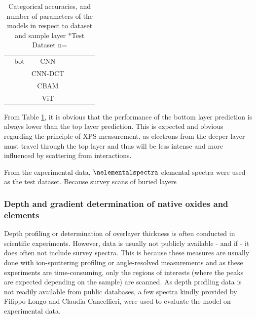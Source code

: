 \begin{table}[H]
{\begin{tabular}{c|c|c|c|c|c|c}
                & bot   & CNN     &                &               &                &             \\
                &       & CNN-DCT &                &               &                &             \\
                &       & CBAM    &                &               &                &            \\
                &       & ViT     &                &               &                &            \\
    \end{tabular}}
    \caption{Categorical accuracies, and number of parameters of the models in respect to dataset and sample layer
    *Test Dataset n=\nelementalspectra}
    \label{tab:acc_qual}
\end{table}

From Table \ref{tab:acc_qual}, it is obvious that the performance of the bottom layer prediction is always lower than the top layer prediction. This is expected and obvious regarding the principle of XPS measurement, as electrons from the deeper layer must travel through the top layer and thus will be less intense and more influenced by scattering from interactions.

From the experimental data, $\nelementalspectra$ elemental spectra were used as the test dataset. Because survey scans of buried layers

\subsubsection{Depth and gradient determination of native oxides and elements}
Depth profiling or determination of overlayer thickness is often conducted in scientific experiments. However, data is usually not publicly available - and if - it does often not include survey spectra. This is because these measures are usually done with ion-sputtering profiling or angle-resolved measurements and as these experiments are time-consuming, only the regions of interests (where the peaks are expected depending on the sample) are scanned.
As depth profiling data is not readily available from public databases, a few spectra kindly provided by Filippo Longo and Claudia Cancellieri, were used to evaluate the model on experimental data.


